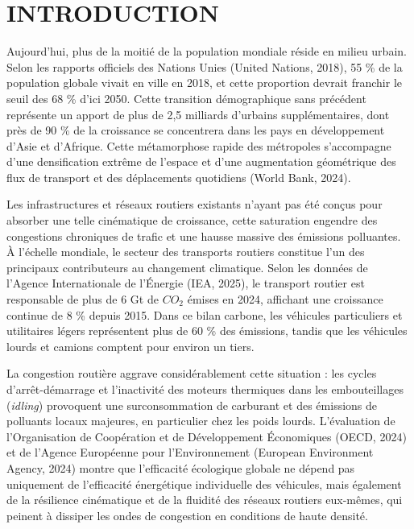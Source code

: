 \documentclass[10pt, a4paper]{article}
\begin{document}
\newpage

\section{INTRODUCTION}\label{introduction}

Aujourd'hui, plus de la moitié de la population mondiale réside en
milieu urbain. Selon les rapports officiels des Nations Unies (United
Nations, 2018), 55 \% de la population globale vivait en ville en 2018,
et cette proportion devrait franchir le seuil des 68 \% d'ici 2050.
Cette transition démographique sans précédent représente un apport de
plus de 2,5 milliards d'urbains supplémentaires, dont près de 90 \% de
la croissance se concentrera dans les pays en développement d'Asie et
d'Afrique. Cette métamorphose rapide des métropoles s'accompagne d'une
densification extrême de l'espace et d'une augmentation géométrique des
flux de transport et des déplacements quotidiens (World Bank, 2024).

Les infrastructures et réseaux routiers existants n'ayant pas été conçus
pour absorber une telle cinématique de croissance, cette saturation
engendre des congestions chroniques de trafic et une hausse massive des
émissions polluantes. À l'échelle mondiale, le secteur des transports
routiers constitue l'un des principaux contributeurs au changement
climatique. Selon les données de l'Agence Internationale de l'Énergie
(IEA, 2025), le transport routier est responsable de plus de 6 Gt de
\(CO_2\) émises en 2024, affichant une croissance continue de 8 \%
depuis 2015. Dans ce bilan carbone, les véhicules particuliers et
utilitaires légers représentent plus de 60 \% des émissions, tandis que
les véhicules lourds et camions comptent pour environ un tiers.

La congestion routière aggrave considérablement cette situation : les
cycles d'arrêt-démarrage et l'inactivité des moteurs thermiques dans les
embouteillages (\emph{idling}) provoquent une surconsommation de
carburant et des émissions de polluants locaux majeures, en particulier
chez les poids lourds. L'évaluation de l'Organisation de Coopération et
de Développement Économiques (OECD, 2024) et de l'Agence Européenne pour
l'Environnement (European Environment Agency, 2024) montre que
l'efficacité écologique globale ne dépend pas uniquement de l'efficacité
énergétique individuelle des véhicules, mais également de la résilience
cinématique et de la fluidité des réseaux routiers eux-mêmes, qui
peinent à dissiper les ondes de congestion en conditions de haute
densité.
\end{document}
